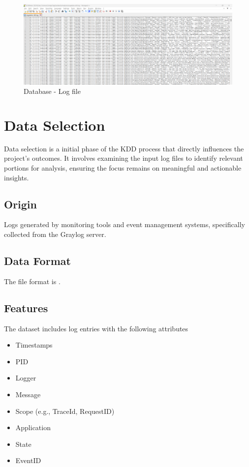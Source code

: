 \begin{figure}
	\begin{center}
		\includegraphics[width=0.9\linewidth]{Images/RawInput.png}
		\caption{Database - Log file}
		\label{RawInput} 
	\end{center}
\end{figure}

\section{Data Selection}

Data selection is a initial phase of the KDD process that directly influences the project’s outcomes. It involves examining the input log files to identify relevant portions for analysis,  ensuring the focus remains on meaningful and actionable insights.

\subsection{Origin}
Logs generated by monitoring tools and event management systems, specifically collected from the Graylog server.

\subsection{Data Format}
The file format is .

\subsection{Features}
The dataset includes log entries with the following attributes
	\begin{itemize}
	\item Timestamps
	\item PID
	\item Logger
	\item Message
	\item Scope (e.g., TraceId, RequestID)
	\item Application
	\item State
	\item EventID
\end{itemize}

